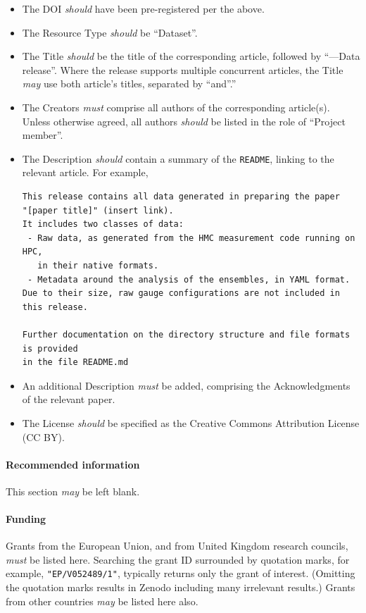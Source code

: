 \documentclass{article}
\newcommand\rfcword[1]{\emph{#1}\xspace}
\newcommand\must{\rfcword{must}}
\newcommand\should{\rfcword{should}}
\newcommand\may{\rfcword{may}}
\newcommand\filename[1]{\texttt{#1}\xspace}
\newcommand\readme{\filename{README}}
\begin{document}
\begin{itemize}
  \item
        The DOI \should have been pre-registered per the above.
  \item
        The Resource Type \should be ``Dataset''.
  \item
        The Title \should be the title of the corresponding article,
        followed by ``---Data release''.
        Where the release supports multiple concurrent articles,
        the Title \may use both article's titles,
        separated by ``and''.''
  \item
        The Creators \must comprise all authors of the corresponding article(s).
        Unless otherwise agreed,
        all authors \should be listed in the role of ``Project member''.
  \item
        The Description \should contain a summary of the \readme,
        linking to the relevant article.
        For example,
\begin{verbatim}
This release contains all data generated in preparing the paper
"[paper title]" (insert link).
It includes two classes of data:
 - Raw data, as generated from the HMC measurement code running on HPC,
   in their native formats.
 - Metadata around the analysis of the ensembles, in YAML format.
Due to their size, raw gauge configurations are not included in this release.

Further documentation on the directory structure and file formats is provided
in the file README.md
\end{verbatim}
  \item
        An additional Description \must be added,
        comprising the Acknowledgments of the relevant paper.
  \item
        The License \should be specified as the Creative Commons Attribution License
        (CC BY).
\end{itemize}

\paragraph{Recommended information}

This section \may be left blank.

\paragraph{Funding}

Grants from the European Union,
and from United Kingdom research councils,
\must be listed here.
Searching the grant ID surrounded by quotation marks,
for example,
\verb|"EP/V052489/1"|,
typically returns only the grant of interest.
(Omitting the quotation marks results in Zenodo including many irrelevant results.)
Grants from other countries \may be listed here also.
\end{document}
